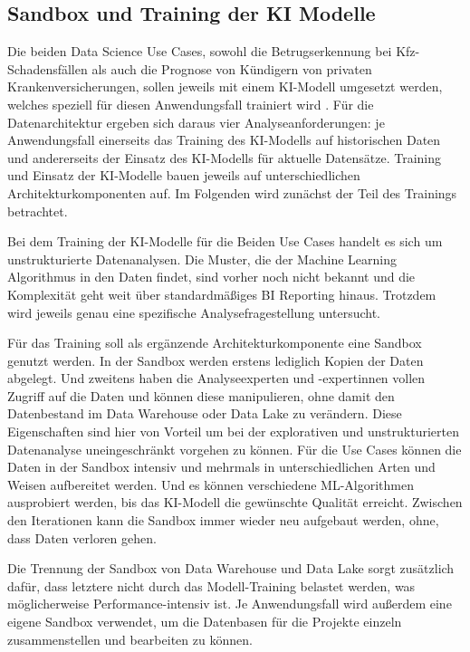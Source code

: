 \subsection{Sandbox und Training der KI Modelle}

Die beiden Data Science Use Cases, 
sowohl die Betrugserkennung bei Kfz-Schadensfällen
als auch die Prognose von Kündigern von privaten Krankenversicherungen,
sollen jeweils mit einem KI-Modell umgesetzt werden, 
welches speziell für diesen Anwendungsfall trainiert wird
\citep[Folien~11~\&~17]{nordakademieSzenarioVersicherung}.
Für die Datenarchitektur ergeben sich daraus
vier Analyseanforderungen: 
je Anwendungsfall einerseits das Training des KI-Modells
auf historischen Daten 
und andererseits der Einsatz des KI-Modells für 
aktuelle Datensätze.
Training und Einsatz der KI-Modelle bauen jeweils auf 
unterschiedlichen Architekturkomponenten auf.
Im Folgenden wird zunächst der Teil des Trainings betrachtet.

Bei dem Training der KI-Modelle für die Beiden Use Cases
handelt es sich um unstrukturierte Datenanalysen.
Die Muster, die der Machine Learning Algorithmus
in den Daten findet, sind vorher noch nicht bekannt
und die Komplexität geht weit über standardmäßiges BI Reporting hinaus.
Trotzdem wird jeweils genau eine spezifische Analysefragestellung untersucht.

Für das Training soll als ergänzende Architekturkomponente 
eine Sandbox genutzt werden.
In der Sandbox werden erstens lediglich Kopien der Daten abgelegt.
Und zweitens haben die Analyseexperten und -expertinnen  
vollen Zugriff auf die Daten und können diese manipulieren,
ohne damit den Datenbestand im Data Warehouse oder Data Lake zu verändern.
Diese Eigenschaften sind hier von Vorteil
um bei der explorativen und unstrukturierten Datenanalyse
uneingeschränkt vorgehen zu können.
Für die Use Cases können die Daten in der Sandbox intensiv 
und mehrmals in unterschiedlichen Arten und Weisen aufbereitet werden.
Und es können verschiedene ML-Algorithmen ausprobiert werden,
bis das KI-Modell die gewünschte Qualität erreicht.
Zwischen den Iterationen kann die Sandbox immer wieder neu
aufgebaut werden, ohne, dass Daten verloren gehen.

Die Trennung der Sandbox von Data Warehouse und Data Lake 
sorgt zusätzlich dafür, dass letztere nicht durch das
Modell-Training belastet werden, was möglicherweise 
Performance-intensiv ist.
Je Anwendungsfall wird außerdem eine eigene Sandbox verwendet,
um die Datenbasen für die Projekte einzeln zusammenstellen und bearbeiten zu können.

